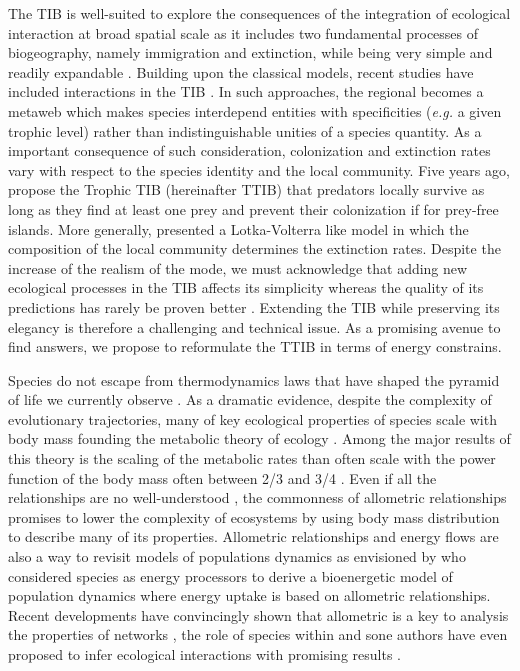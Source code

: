 The TIB is well-suited to explore the consequences of the integration of
ecological interaction at broad spatial scale as it includes two
fundamental processes of biogeography, namely immigration and
extinction, while being very simple and readily expandable
\citep{Losos2010, Warren2015}. Building upon the classical models,
recent studies have included interactions in the TIB
\citep{Gravel2011, Cazelles2015a}. In such approaches, the regional
becomes a metaweb which makes species interdepend entities with
specificities (\emph{e.g.} a given trophic level) rather than
indistinguishable unities of a species quantity. As a important
consequence of such consideration, colonization and extinction rates
vary with respect to the species identity and the local community. Five
years ago, \citet{Gravel2011} propose the Trophic TIB (hereinafter TTIB)
that predators locally survive as long as they find at least one prey
and prevent their colonization if for prey-free islands. More generally,
\citet{Cazelles2015a} presented a Lotka-Volterra like model in which the
composition of the local community determines the extinction rates.
Despite the increase of the realism of the mode, we must acknowledge
that adding new ecological processes in the TIB affects its simplicity
whereas the quality of its predictions has rarely be proven better
\citep[see][]{Cirtwill2015}. Extending the TIB while preserving its
elegancy is therefore a challenging and technical issue. As a promising
avenue to find answers, we propose to reformulate the TTIB in terms of
energy constrains.

Species do not escape from thermodynamics laws that have shaped the
pyramid of life we currently observe \citep{Trebilco2013}. As a dramatic
evidence, despite the complexity of evolutionary trajectories, many of
key ecological properties of species scale with body mass
\citep{Woodward2005a} founding the metabolic theory of ecology
\citep{Brown2004}. Among the major results of this theory is the scaling
of the metabolic rates \citep{Gillooly2001} than often scale with the
power function of the body mass often between 2/3 and 3/4
\citep{White2013}. Even if all the relationships are no well-understood
\citep[see the case of abundances reviewed in][ and the recent
relationship between prey and predator biomasses
\citet{Hatton2015}]{White2007}, the commonness of allometric
relationships promises to lower the complexity of ecosystems by using
body mass distribution to describe many of its properties. Allometric
relationships and energy flows are also a way to revisit models of
populations dynamics as envisioned by \citet{Yodzis1992} who considered
species as energy processors to derive a bioenergetic model of
population dynamics where energy uptake is based on allometric
relationships. Recent developments have convincingly shown that
allometric is a key to analysis the properties of networks \citep[such
as stability][]{Brose2006}, the role of species within
\citep{Schneider2012} and sone authors have even proposed to infer
ecological interactions with promising results
\citep{Gravel2013, Petchey2008}.

